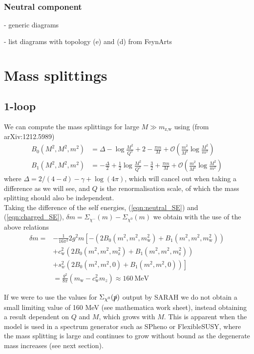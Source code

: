 \documentclass[11pt]{article}
\def\sp{\slashed{p}}
\def\cn{\chi^0}
\def\cm{\chi^-}
\begin{document}
\subsubsection{Neutral component}

- generic diagrams

- list diagrams with topology (e) and (d) from FeynArts












\section{Mass splittings}

\subsection{1-loop}
We can compute the mass splittings for large $M\gg m_{\text{z,w}}$ using (from arXiv:1212.5989)
\begin{align}
B_0(M^2,M^2,m^2)&=\Delta-\log\frac{M^2}{Q^2}+2-\frac{\pi m}{M}+\mathcal{O}\left(\frac{m^2}{M^2}\log\frac{M^2}{m^2}\right)\\
B_1(M^2,M^2,m^2)&=-\frac{\Delta}{2}+\frac{1}{2}\log\frac{M^2}{Q^2}-\frac{3}{2}+\frac{\pi m}{M}+\mathcal{O}\left(\frac{m^2}{M^2}\log\frac{M^2}{m^2}\right)
\end{align}
where $\Delta=2/(4-d)-\gamma+\log(4\pi)$, which will cancel out when taking a difference as we will see, and $Q$ is the renormalisation scale, of which the mass splitting should also be independent.\\

Taking the difference of the self energies, (\ref{eqn:neutral_SE}) and (\ref{eqn:charged_SE}), $\delta m=\Sigma_{\cm}(m)-\Sigma_{\cn}(m)$ we obtain with the use of the above relations
\begin{align*}
\delta m=&-\frac{1}{16\pi^2}2g^2m \left[  -(2B_0(m^2,m^2,m_{\text{w}}^2)+B_1(m^2,m^2,m_{\text{w}}^2)) \right.\\ & +c_{\text{w}}^2 (2B_0(m^2,m^2,m_{\text{z}}^2)+B_1(m^2,m^2,m_{\text{z}}^2)) \\&\left.+s_w^2(2B_0(m^2,m^2,0)+B_1(m^2,m^2,0))\right]\\
&=\frac{g^2}{8\pi}(m_{\text{w}}-c_{\text{w}}^2m_z)\approx 160\ \text{MeV}
\end{align*}

If we were to use the values for $\Sigma_{\cn}(\sp)$ output by SARAH we do not obtain a small limiting value of 160 MeV (see mathematica work sheet), instead obtaining a result dependent on $Q$ and $M$, which grows with $M$.  This is apparent when the model is used in a spectrum generator such as SPheno or FlexibleSUSY, where the mass splitting is large and continues to grow without bound as the degenerate mass increases (see next section).\\
\end{document}
